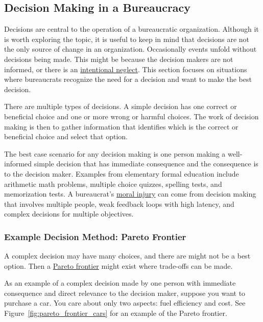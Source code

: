 \subsection{Decision Making in a Bureaucracy\label{sec:decision-making}}

Decisions are central to the operation of a bureaucratic organization. Although it is worth exploring the topic, it is useful to keep in mind that decisions are not the only source of change in an organization. Occasionally events unfold without decisions being made. This might be because the decision makers are not informed, or there is an \href{https://en.wikipedia.org/wiki/Willful_blindness}{intentional neglect}. This section focuses on situations where bureaucrats recognize the need for a decision and want to make the best decision.

There are multiple types of decisions. 
A \gls{simple decision} has one correct or beneficial choice and one or more wrong or harmful choices. The work of decision making is then to gather information that identifies which is the correct or beneficial choice and select that option.

The best case scenario for any decision making is one person making a well-informed simple decision that has immediate consequence and the consequence is to the decision maker. Examples from elementary formal education include arithmetic math problems, multiple choice quizzes, spelling tests, and memorization tests. A bureaucrat's \href{https://en.wikipedia.org/wiki/Moral_injury}{moral injury} can come from decision making that involves multiple people, weak feedback loops with high latency, and complex decisions for multiple objectives.

\subsubsection{Example Decision Method: Pareto Frontier\label{sec:pareto}}

A complex decision may have many choices, and there are might not be a best option. Then a \href{https://en.wikipedia.org/wiki/Pareto_front}{Pareto frontier} might exist where trade-offs can be made. 

As an example of a complex decision made by one person with immediate consequence and direct relevance to the decision maker, suppose you want to purchase a car. You care about only two aspects: fuel efficiency and cost. See Figure~\ref{fig:pareto_frontier_cars} for an example of the Pareto frontier.

